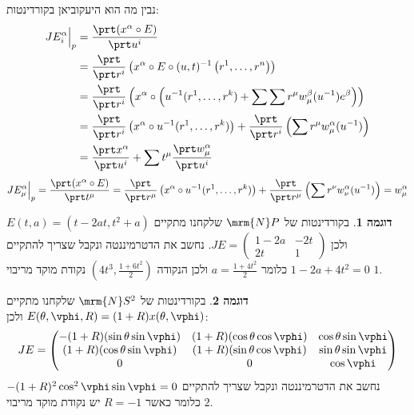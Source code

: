 \documentclass{article}
\theoremstyle{definition}
\newtheorem*{example*}{דוגמה}
\begin{document}
	נבין מה הוא היעקוביאן בקורדינטות:
	\begin{equation*}\begin{split}
		JE^\alpha_i\Big|_p
		&= \frac{\prt (x^\alpha \circ E)}{\prt u^i}
		\\&= \frac{\prt}{\prt r^i}\left (x^\alpha \circ E \circ (u,t)^{-1}\left(r^1,\dotsc,r^n\right)\right)
		\\&= \frac{\prt}{\prt r^i} \left(x^\alpha \circ \left(u^{-1}(r^1,\dotsc,r^k) + \sum\sum r^\mu w_\mu^\beta(u^{-1}) e^\beta \right)\right)
		\\&= \frac{\prt}{\prt r^i} \left(x^\alpha \circ u^{-1}(r^1,\dotsc,r^k)\right) + \frac{\prt}{\prt r^i} \left(\sum r^\mu w_\mu^\alpha(u^{-1}) \right)
		\\&= \frac{\prt x^\alpha}{\prt u^i} + \sum t^\mu \frac{\prt w_\mu^\alpha}{\prt u^i}
	\end{split}\end{equation*}
	\begin{equation*}
		JE^\alpha_\mu\Big|_p
		= \frac{\prt (x^\alpha \circ E)}{\prt t^\mu}
		= \frac{\prt}{\prt r^\mu} \left(x^\alpha \circ u^{-1}(r^1,\dotsc,r^k)\right) + \frac{\prt}{\prt r^\mu} \left(\sum r^\nu w_\nu^\alpha(u^{-1}) \right)
		= w_\mu^\alpha
	\end{equation*}

	\begin{example*}
		בקורדינטות של
		\(\mrm{N} P\)
		שלקחנו מתקיים
		\(
			E(t,a) = (t-2at,t^2+a)
		\)
		ולכן
		\(
			JE = \begin{pmatrix}
				1-2a & -2t
				\\
				2t & 1
			\end{pmatrix}
		\).
		נחשב את הדטרמיננטה ונקבל שצריך להתקיים
		\(1-2a+4t^2=0\)
		כלומר
		\(a=\frac{1+4t^2}{2}\)
		ולכן הנקודה
		\(\left(4t^3,\frac{1+6t^2}{2}\right)\)
		נקודת מוקד מריבוי \(1\).
	\end{example*}

	\begin{example*}
		בקורדינטות של
		\(\mrm{N} S^2\)
		שלקחנו מתקיים
		\(
		E(\theta,\vphi,R) = (1+R)x(\theta,\vphi)
		\)
		ולכן:
		\[
			JE = \begin{pmatrix}
				-(1+R)(\sin\theta \sin\vphi) & (1+R)(\cos\theta \cos\vphi) & \cos\theta \sin\vphi
				\\
				(1+R)(\cos\theta \sin\vphi) & (1+R)(\sin\theta \cos\vphi) & \sin\theta \sin\vphi
				\\
				0 & 0 & \cos \vphi
			\end{pmatrix}
		\]
		נחשב את הדטרמיננטה ונקבל שצריך להתקיים
		\(-(1+R)^2 \cos^2\vphi \sin\vphi=0\)
		כלומר כאשר
		\(R=-1\)
		יש נקודת מוקד מריבוי \(2\).
	\end{example*}
\end{document}
